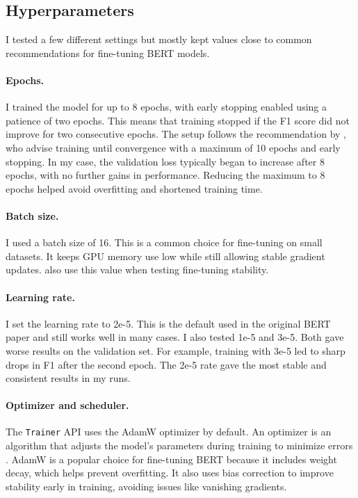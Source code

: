 \subsection{Hyperparameters}
    I tested a few different settings but mostly kept values close to common recommendations for fine-tuning BERT models.

    \paragraph{Epochs.} I trained the model for up to 8 epochs, with early stopping enabled using a patience of two epochs. This means that training stopped if the F1 score did not improve for two consecutive epochs. The setup follows the recommendation by \textcite{pecherComparingSpecialisedSmall2024}, who advise training until convergence with a maximum of 10 epochs and early stopping. In my case, the validation loss typically began to increase after 8 epochs, with no further gains in performance. Reducing the maximum to 8 epochs helped avoid overfitting and shortened training time.

    \paragraph{Batch size.} I used a batch size of 16. This is a common choice for fine-tuning on small datasets. It keeps GPU memory use low while still allowing stable gradient updates. \textcite{mosbachStabilityFinetuningBERT2021} also use this value when testing fine-tuning stability.

    \paragraph{Learning rate.} I set the learning rate to 2e-5. This is the default used in the original BERT paper \parencite{devlinBERTPretrainingDeep2019} and still works well in many cases. I also tested 1e-5 and 3e-5. Both gave worse results on the validation set. For example, training with 3e-5 led to sharp drops in F1 after the second epoch. The 2e-5 rate gave the most stable and consistent results in my runs.

    \paragraph{Optimizer and scheduler.} The \texttt{Trainer} API uses the AdamW optimizer by default. An optimizer is an algorithm that adjusts the model’s parameters during training to minimize errors \parencite{mosbachStabilityFinetuningBERT2021}. AdamW is a popular choice for fine-tuning BERT because it includes weight decay, which helps prevent overfitting. It also uses bias correction to improve stability early in training, avoiding issues like vanishing gradients.

